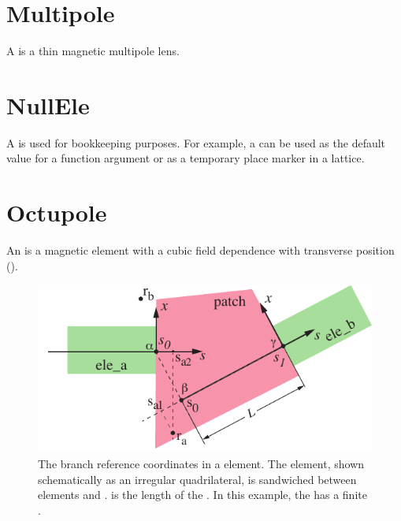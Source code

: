 \section{Multipole}
\label{s:mult}

A  is a thin magnetic multipole lens.

\section{NullEle}
\label{s:nullele}

A  is used for bookkeeping purposes. For example, a  can be used as
the default value for a function argument or as a temporary place marker in a lattice.

\section{Octupole}
\label{s:octupole}

An  is a magnetic element with a cubic field dependence
with transverse position ().


\begin{figure}[bt]
  \centering
  \includegraphics[width=5in]{patch-problem.pdf}
  \caption[The branch reference coordinates in a  element.]
{The branch reference coordinates in a  element. The  element, shown
schematically as an irregular quadrilateral, is sandwiched between elements  and
.  is the length of the . In this example, the  has a finite
.}
  \label{f:patch.prob}
\end{figure}

